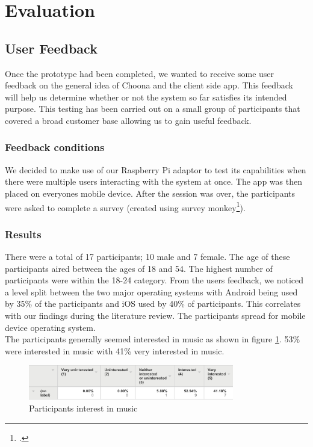 \section{Evaluation}

\subsection{User Feedback}
Once the prototype had been completed, we wanted to receive some user feedback on the general idea of Choona and the client side app. This feedback will help us determine whether or not the system so far satisfies its intended purpose. This testing has been carried out on a small group of participants that covered a broad customer base allowing us to gain useful feedback.

\subsubsection{Feedback conditions}
We decided to make use of our Raspberry Pi adaptor to test its capabilities when there were multiple users interacting with the system at once. The app was then placed on everyones mobile device. After the session was over, the participants were asked to complete a survey (created using survey monkey\footcite{survey}).  

\subsubsection{Results}
There were a total of 17 participants; 10 male and 7 female. The age of these participants aired between the ages of 18 and 54. The highest number of participants were within the 18-24 category.    
From the users feedback, we noticed a level split between the two major operating systems with Android being used by 35\% of the participants and iOS used by 40\% of participants.  This correlates with our findings during the literature review.  The participants spread for mobile device operating system.  \\
The participants generally seemed interested in music as shown in figure \ref{fig:interest_music}.  53\% were interested in music with 41\% very interested in music.  \\

    \begin{figure}[h!]
      \centering
      \includegraphics[width=0.8\textwidth]{./img/music_interest.png}
      \caption{Participants interest in music}
      \label{fig:interest_music}
    \end{figure}

